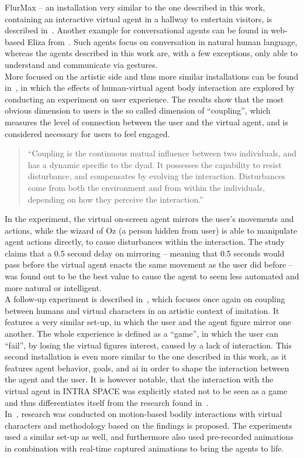 \documentclass[draft,final]{vutinfth} %
\begin{document}
FlurMax – an installation very similar to the one described in this work, containing an interactive virtual agent in a hallway to entertain \glspl{visitor}, is described in~\cite{10.1007/978-3-540-39396-2_5}. 
Another example for conversational agents can be found in web-based Eliza from~\cite{llorach2017say}. 
Such agents focus on conversation in natural human language, whereas the agents described in this work are, with a few exceptions, only able to understand and communicate via gestures. \\
More focused on the artistic side and thus more similar installations can be found in~\cite{bevacqua2014effects}, in which the effects of human-virtual agent body interaction are explored by conducting an experiment on user experience. 
The results show that the most obvious dimension to users is the so called dimension of “coupling”, which measures the level of connection between the user and the virtual agent, and is considered necessary for users to feel engaged.
\begin{quote}
	``Coupling is the continuous mutual influence between two individuals, and has a dynamic specific to the dyad. It possesses the capability to resist disturbance, and compensates by evolving the interaction. Disturbances come from both the environment and from within the individuals, depending on how they perceive the interaction.''~\cite[p.~1]{bevacqua2014effects}
\end{quote}
In the experiment, the virtual on-screen agent mirrors the user’s movements and actions, while the wizard of Oz (a person hidden from user) is able to manipulate agent actions directly, to cause disturbances within the interaction. 
The study claims that a 0.5 second delay on mirroring – meaning that 0.5 seconds would pass before the virtual agent enacts the same movement as the user did before – was found out to be the best value to cause the agent to seem less automated and more natural or intelligent. \\
A follow-up experiment is described in~\cite{bevacqua2015gestural}, which focuses once again on coupling between humans and virtual characters in an artistic context of imitation. 
It features a very similar set-up, in which the user and the agent figure mirror one another. 
The whole experience is defined as a “game”, in which the user can “fail”, by losing the virtual figures interest, caused by a lack of interaction. 
This second installation is even more similar to the one described in this work, as it features agent behavior, goals, and \gls{ai} in order to shape the interaction between the agent and the user. 
It is however notable, that the interaction with the virtual agent in INTRA SPACE was explicitly stated not to be seen as a game and thus differentiates itself from the research found in~\cite{bevacqua2015gestural}. \\
In~\cite{pugliese2011framework}, research was conducted on motion-based bodily interactions with virtual characters and methodology based on the findings is proposed. 
The experiments used a similar set-up as well, and furthermore also used pre-recorded animations in combination with real-time captured animations to bring the agents to life.
\end{document}
